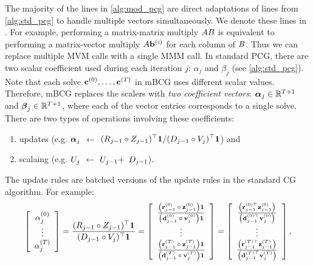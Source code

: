 The majority of the lines in \cref{alg:mod_pcg} are direct adaptations of lines from \cref{alg:std_pcg} to handle multiple vectors simultaneously.
We denote these lines in {\color{\colormat} }.
For example, performing a matrix-matrix multiply $A B$ is equivalent to performing a matrix-vector multiply $A \mathbf{b}^{(i)}$ for each column of $B$.
Thus we can replace multiple MVM calls with a single MMM call.
In standard PCG, there are two scalar coefficient used during each iteration $j$: $\alpha_j$ and $\beta_j$ (see \cref{alg:std_pcg}).
Note that each solve $\mathbf{c}^{(0)}, \ldots, \mathbf{c}^{(T)}$ in mBCG uses different scalar values.
Therefore, mBCG replaces the scalers with \emph{two coefficient vectors}: $\boldsymbol{\alpha}_j \in \mathbb{R}^{T+1}$ and $\boldsymbol{\beta}_j \in \mathbb{R}^{T+1}$, where each of the vector entries corresponds to a single solve.
There are two types of operations involving these coefficients:
%
\begin{enumerate}
  \item updates (e.g. {\color{\colormat} $\boldsymbol{\alpha}_j$ $\gets$ ${( R_{j-1} \circ Z_{j-1} )^\top \mathbf 1}/{( D_{j-1} \circ V_{j} )^\top \mathbf 1}$}) and
  \item scalaing (e.g. {\color{\colormat} $U_j$ $\gets$ $U_{j-1} +$  $D_{j-1}$}).
\end{enumerate}
%
The update rules are batched versions of the update rules in the standard CG algorithm.
For example:
%
\begin{equation*}
  \left[ \begin{array}{c}
    \alpha_j^{(0)}
    \\
    \vdots
    \\
    \alpha_j^{(T)}
  \end{array} \right]
  = \frac{( R_{j-1} \circ Z_{j-1} )^\top \mathbf 1}{( D_{j-1} \circ V_{j} )^\top \mathbf 1}
  = \left[ \begin{array}{c}
      \frac{\left( \mathbf{r}_{j-1}^{(0)} \: \circ \: \mathbf{z}_{j-1}^{(0)} \right) \mathbf 1}
        {\left( \mathbf{d}_{j-1}^{(0)} \: \circ \: \mathbf{v}_{j}^{(0)} \right) \mathbf 1}
        \\
        \vdots
        \\
        \frac{\left( \mathbf{r}_{j-1}^{(T)} \: \circ \: \mathbf{z}_{j-1}^{(T)} \right) \mathbf 1}
        {\left( \mathbf{d}_{j-1}^{(T)} \: \circ \: \mathbf{v}_{j}^{(T)} \right) \mathbf 1}
     \end{array} \right]
  = \left[ \begin{array}{c}
      \frac{\left( \mathbf{r}_{j-1}^{(0)\top} \mathbf{z}_{j-1}^{(0)} \right)}
        {\left( \mathbf{d}_{j-1}^{(0)\top} \mathbf{v}_{j}^{(0)} \right)}
        \\
        \vdots
        \\
        \frac{\left( \mathbf{r}_{j-1}^{(T)\top} \mathbf{z}_{j-1}^{(T)} \right)}
        {\left( \mathbf{d}_{j-1}^{(T)\top} \mathbf{v}_{j}^{(T)} \right)}
     \end{array} \right],
\end{equation*}
